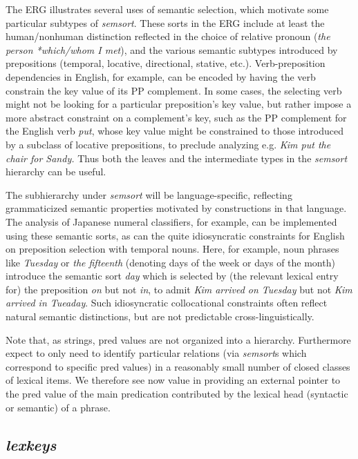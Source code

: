 \documentclass[12pt]{article}
\begin{document}
The ERG illustrates several uses of semantic selection, which motivate
some particular subtypes of {\it semsort}.  These sorts in the ERG
include at least the human/nonhuman distinction reflected in the
choice of relative pronoun ({\it the person *which/whom I met}), and
the various semantic subtypes introduced by prepositions (temporal,
locative, directional, stative, etc.).  Verb-preposition dependencies
in English, for example, can be encoded by having the verb constrain
the {\sc key} value of its PP complement.  In some cases, the
selecting verb might not be looking for a particular preposition's
{\sc key} value, but rather impose a more abstract constraint on a
complement's key, such as the PP complement for the English verb {\it
put}, whose {\sc key} value might be constrained to those introduced
by a subclass of locative prepositions, to preclude analyzing
e.g. {\it *Kim put the chair for Sandy.}  Thus both the leaves and
the intermediate types in the {\it semsort} hierarchy can be useful.

The subhierarchy under {\it semsort} will be language-specific,
reflecting grammaticized semantic properties motivated by
constructions in that language.  The analysis of Japanese numeral
classifiers, for example, can be implemented using these semantic
sorts, as can the quite idiosyncratic constraints for English on
preposition selection with temporal nouns.  Here, for example, noun
phrases like {\it Tuesday} or {\it the fifteenth} (denoting days of
the week or days of the month) introduce the semantic sort {\it day}
which is selected by (the relevant lexical entry for) the preposition
{\it on} but not {\it in}, to admit {\it Kim arrived on Tuesday} but
not {\it *Kim arrived in Tueaday}.  Such idiosyncratic collocational
constraints often reflect natural semantic distinctions, but are not
predictable cross-linguistically.

Note that, as strings, {\sc pred} values are not organized into a hierarchy.
Furthermore expect to only need to identify particular relations
(via {\it semsort}s which correspond to specific {\sc pred} values)
in a reasonably small number of closed classes of lexical items.
We therefore see now value in providing an external pointer to the
{\sc pred} value of the main predication contributed by the lexical
head (syntactic or semantic) of a phrase.


\subsection{{\it lexkeys}}
\label{lexkeysec}
\end{document}
